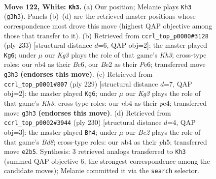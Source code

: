 \documentclass[11pt]{article}
\begin{document}
\clearpage

\begin{figure}[p]\centering
\begin{subfigure}{0.46\textwidth}\centering
\resizebox{\linewidth}{!}{%
\newchessgame
\chessboard[
  setfen={8/8/6k1/6p1/1n6/6K1/4B3/8 w - - 1 122},
  showmover=false,
  pgfstyle=straightmove, color=movearrow, markmove={g3-h3}
]}
\caption{}
\end{subfigure}\hfill
\begin{subfigure}{0.46\textwidth}\centering
\resizebox{\linewidth}{!}{%
\newchessgame
\chessboard[
  setfen={8/8/2b1p2k/8/5P2/6K1/8/B7 b - - 0 117},
  showmover=false,
  pgfstyle=straightmove, color=movearrow, markmove={h6-g6}
]}
\caption{}
\end{subfigure}
\\[4pt]
\begin{subfigure}{0.46\textwidth}\centering
\resizebox{\linewidth}{!}{%
\newchessgame
\chessboard[
  setfen={8/3b4/7k/8/1B2P3/5P2/5K2/8 b - - 54 115},
  showmover=false,
  pgfstyle=straightmove, color=movearrow, markmove={h6-g6}
]}
\caption{}
\end{subfigure}\hfill
\begin{subfigure}{0.46\textwidth}\centering
\resizebox{\linewidth}{!}{%
\newchessgame
\chessboard[
  setfen={3B4/1b6/8/5k1p/5p2/8/5K2/8 w - - 78 116},
  showmover=false,
  pgfstyle=straightmove, color=movearrow, markmove={d8-h4}
]}
\caption{}
\end{subfigure}
\caption{\textbf{Move 122, White: \texttt{Kh3}.} (a) Our position; Melanie plays \texttt{Kh3} (\texttt{g3h3}). Panels (b)--(d) are the retrieved master positions whose correspondence most drove this move (highest QAP objective among those that transfer to it). (b) Retrieved from \texttt{ccrl\_top\_p0000\#3128} (ply 233) [structural distance $d$=6, QAP obj=2]: the master played \texttt{Kg6}; under $\mu$ our \emph{Kg3} plays the role of that game's \emph{Kh3}; cross-type roles: our \emph{n}b4 as their \emph{B}c6, our \emph{B}e2 as their \emph{P}e6; transferred move \texttt{g3h3} \textbf{(endorses this move)}. (c) Retrieved from \texttt{ccrl\_top\_p0001\#807} (ply 229) [structural distance $d$=7, QAP obj=2]: the master played \texttt{Kg6}; under $\mu$ our \emph{Kg3} plays the role of that game's \emph{Kh3}; cross-type roles: our \emph{n}b4 as their \emph{p}e4; transferred move \texttt{g3h3} \textbf{(endorses this move)}. (d) Retrieved from \texttt{ccrl\_top\_p0002\#3944} (ply 230) [structural distance $d$=4, QAP obj=3]: the master played \texttt{Bh4}; under $\mu$ our \emph{Be2} plays the role of that game's \emph{Bd8}; cross-type roles: our \emph{n}b4 as their \emph{p}h5; transferred move \texttt{e2b5}. Synthesis: 3 retrieved analogs transferred to \texttt{Kh3} (summed QAP objective 6, the strongest correspondence among the candidate moves); Melanie committed it via the \texttt{search} selector.}
\label{fig:thought-m242}
\end{figure}
\end{document}
